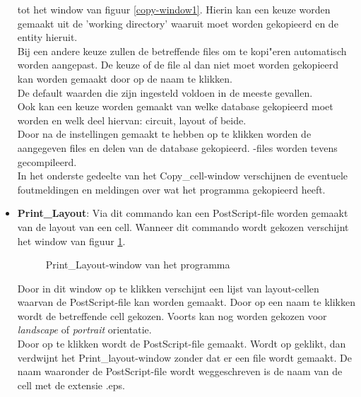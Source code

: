 \begin{itemize}
                  tot het window van figuur \ref{copy-window1}.
                  Hierin kan een keuze worden gemaakt uit de 'working directory'
                  waaruit moet worden gekopieerd en de entity hieruit.\\
                  Bij een andere keuze zullen de betreffende files om te
                  kopi"eren automatisch worden aangepast.
                  De keuze of de file al dan niet moet worden gekopieerd kan
                  worden gemaakt door op de naam te klikken.\\
                  De default waarden die zijn ingesteld voldoen in de meeste
                  gevallen.\\
                  Ook kan een keuze worden gemaakt van welke  database
                  gekopieerd moet worden en welk deel hiervan: circuit, layout
                  of beide.\\
                  Door na de instellingen gemaakt te hebben op  te
                  klikken worden de aangegeven files en delen van de 
                  database gekopieerd. -files worden tevens gecompileerd.\\
                  In het onderste gedeelte van het Copy\_cell-window verschijnen de
                  eventuele foutmel\-ding\-en en meldingen over wat het
                  programma gekopieerd heeft.
\item {\bf Print\_Layout}: Via dit commando kan een PostScript-file worden gemaakt van de
                     layout van een cell.
                    Wanneer dit commando wordt gekozen verschijnt het window van
                    figuur \ref{pr-layout-window}.
                    \begin{figure}[htb]
                    \centerline{}
                    \caption{Print\_Layout-window van het programma }
                    \label{pr-layout-window}
                    \end{figure}
                    Door in dit window op  te klikken verschijnt een lijst
                    van layout-cellen waarvan de PostScript-file kan worden gemaakt.
                    Door op een naam te klikken wordt de betreffende cell gekozen.
		    Voorts kan nog worden gekozen voor {\it landscape} of {\it portrait} orientatie.\\
                    Door op  te klikken wordt de PostScript-file gemaakt. Wordt
                    op  ge\-klikt, dan verdwijnt het Print\_layout-window
                    zonder dat er een file wordt gemaakt.
                    De naam waaronder de PostScript-file wordt weggeschreven is de
                    naam van de cell met de extensie .eps.
\end{itemize}

